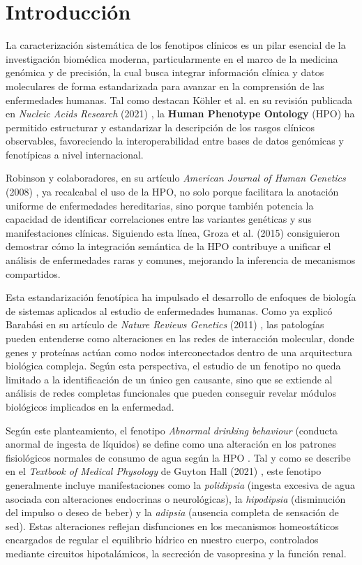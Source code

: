 \section{Introducción}

La caracterización sistemática de los fenotipos clínicos es un pilar esencial de la investigación biomédica moderna, particularmente en el marco de la medicina genómica y de precisión, la cual busca integrar información clínica y datos moleculares de forma estandarizada para avanzar en la comprensión de las enfermedades humanas. Tal como destacan Köhler et al. en su revisión publicada en \textit{Nucleic Acids Research} (2021) \cite{kohler2021hpo}, la \textbf{Human Phenotype Ontology} (HPO) ha permitido estructurar y estandarizar la descripción de los rasgos clínicos observables, favoreciendo la interoperabilidad entre bases de datos genómicas y fenotípicas a nivel internacional.

Robinson y colaboradores, en su artículo \textit{American Journal of Human Genetics} (2008) \cite{robinson2008hpo}, ya recalcabal el uso de la HPO, no solo porque facilitara la anotación uniforme de enfermedades hereditarias, sino porque también potencia la capacidad de identificar correlaciones entre las variantes genéticas y sus manifestaciones clínicas. Siguiendo esta línea, Groza et al. (2015) \cite{groza2015hpo} consiguieron demostrar cómo la integración semántica de la HPO contribuye a unificar el análisis de enfermedades raras y comunes, mejorando la inferencia de mecanismos compartidos.

Esta estandarización fenotípica ha impulsado el desarrollo de enfoques de biología de sistemas aplicados al estudio de enfermedades humanas. Como ya explicó Barabási en su artículo de \textit{Nature Reviews Genetics} (2011) \cite{barabasi2011network}, las patologías pueden entenderse como alteraciones en las redes de interacción molecular, donde genes y proteínas actúan como nodos interconectados dentro de una arquitectura biológica compleja. Según esta perspectiva, el estudio de un fenotipo no queda limitado a la identificación de un único gen causante, sino que se extiende al análisis de redes completas funcionales que pueden conseguir revelar módulos biológicos implicados en la enfermedad.

Según este planteamiento, el fenotipo \textit{Abnormal drinking behaviour} (conducta anormal de ingesta de líquidos) se define como una alteración en los patrones fisiológicos normales de consumo de agua según la HPO \cite{kohler2021hpo}. Tal y como se describe en el \textit{Textbook of Medical Physology} de Guyton Hall (2021) \cite{guyton2021physiology}, este fenotipo generalmente incluye manifestaciones como la \textit{polidipsia} (ingesta excesiva de agua asociada con alteraciones endocrinas o neurológicas), la \textit{hipodipsia} (disminución del impulso o deseo de beber) y la \textit{adipsia} (ausencia completa de sensación de sed). Estas alteraciones reflejan disfunciones en los mecanismos homeostáticos encargados de regular el equilibrio hídrico en nuestro cuerpo, controlados mediante circuitos hipotalámicos, la secreción de vasopresina y la función renal.


